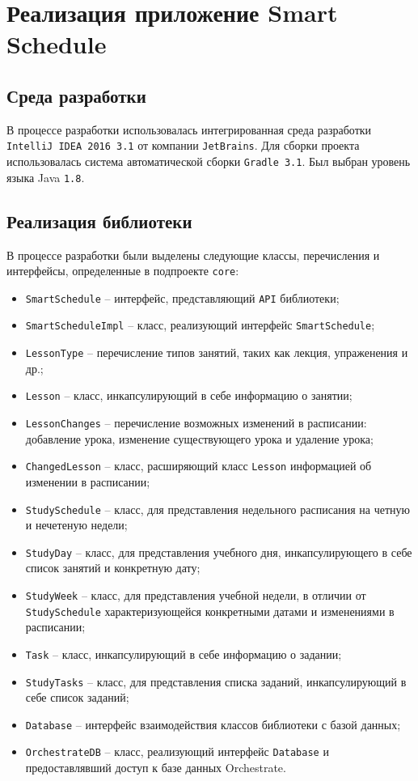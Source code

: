 \section{Реализация приложение Smart Schedule}

\subsection{Среда разработки}

В процессе разработки использовалась интегрированная среда разработки \texttt{IntelliJ IDEA 2016 3.1} от компании \texttt{JetBrains}. Для сборки проекта использовалась система автоматической сборки \texttt{Gradle 3.1}. Был выбран уровень языка Java \texttt{1.8}.

\subsection{Реализация библиотеки}
В процессе разработки были выделены следующие классы, перечисления и интерфейсы, определенные в подпроекте \texttt{core}:
\begin{itemize}
\item \verb+SmartSchedule+ -- интерфейс, представляющий \texttt{API} библиотеки;
\item \verb+SmartScheduleImpl+ -- класс, реализующий интерфейс \texttt{SmartSchedule};
\item \verb+LessonType+ -- перечисление типов занятий, таких как лекция, упраженения и др.;
\item \verb+Lesson+ -- класс, инкапсулирующий в себе информацию о занятии;
\item \verb+LessonChanges+ -- перечисление возможных изменений в расписании: добавление урока, изменение существующего урока и удаление урока;
\item \verb+ChangedLesson+ -- класс, расширяющий класс \texttt{Lesson} информацией об изменении в расписании;
\item \verb+StudySchedule+ -- класс, для представления недельного расписания на четную и нечетеную недели;
\item \verb+StudyDay+ -- класс, для представления учебного дня, инкапсулирующего в себе список занятий и конкретную дату;
\item \verb+StudyWeek+ -- класс, для представления учебной недели, в отличии от \texttt{StudySchedule} характеризующейся конкретными датами и изменениями в расписании;
\item \verb+Task+ -- класс, инкапсулирующий в себе информацию о задании;
\item \verb+StudyTasks+ -- класс, для представления списка заданий, инкапсулирующий в себе список заданий;
\item \verb+Database+ -- интерфейс взаимодействия классов библиотеки с базой данных;
\item \verb+OrchestrateDB+ -- класс, реализующий интерфейс \texttt{Database} и предоставлявший доступ к базе данных Orchestrate.
\end{itemize}

